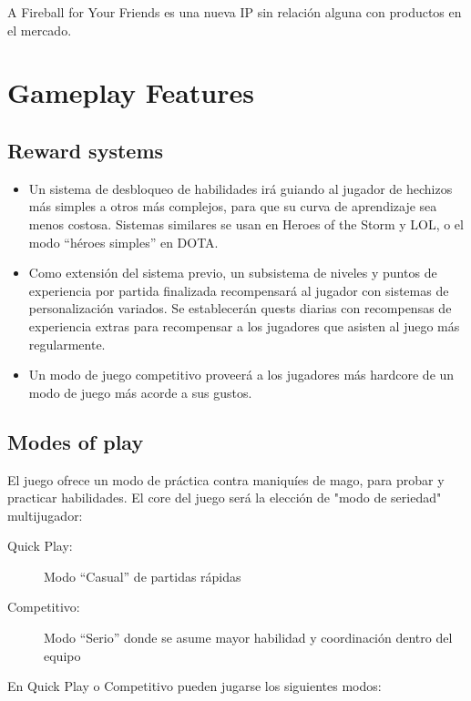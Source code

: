 \documentclass[12pt]{article}
\begin{document}
A Fireball for Your Friends es una nueva IP sin relación alguna con productos en el mercado.

\newpage

\section{Gameplay Features}     

\subsection{Reward systems}

\begin{itemize}
\item Un sistema de desbloqueo de habilidades irá guiando al jugador de hechizos más simples a otros más complejos, para que su curva de aprendizaje sea menos costosa. Sistemas similares se usan en Heroes of the Storm y LOL, o el modo ``héroes simples'' en DOTA.
\item Como extensión del sistema previo, un subsistema de niveles y puntos de experiencia por partida finalizada recompensará al jugador con sistemas de personalización variados. Se establecerán quests diarias con recompensas de experiencia extras para recompensar a los jugadores que asisten al juego más regularmente.
\item Un modo de juego competitivo proveerá a los jugadores más hardcore de un modo de juego más acorde a sus gustos.
\end{itemize}     

\subsection{Modes of play}

El juego ofrece un modo de práctica contra maniquíes de mago, para probar y practicar habilidades. El core del juego será la elección de "modo de seriedad" multijugador:

\begin{description}
\item[Quick Play:] Modo ``Casual'' de partidas rápidas
\item[Competitivo:] Modo ``Serio'' donde se asume mayor habilidad y coordinación dentro del equipo
\end{description}

\newpage

En Quick Play o Competitivo pueden jugarse los siguientes modos:
\end{document}
